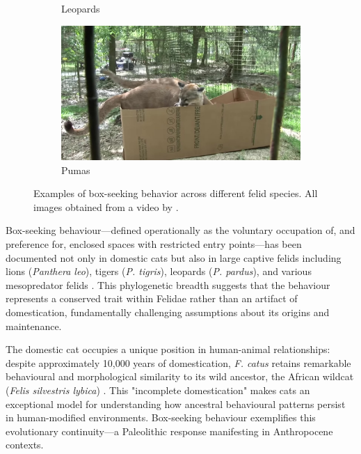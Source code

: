 \documentclass[12pt,a4paper]{article}
\begin{document}
\begin{figure}[h!]
\begin{subfigure}[b]{0.24\textwidth}
        \caption{Leopards}
        \label{fig:leopards}
    \end{subfigure}
    \hfill
    \begin{subfigure}[b]{0.24\textwidth}
        \includegraphics[width=\textwidth]{08_ares_orion_pumas.jpg}
        \caption{Pumas}
        \label{fig:pumas}
    \end{subfigure}
    \caption{Examples of box-seeking behavior across different felid species. All images obtained from a video by \citet{bigcatrescue2019}.}
    \label{fig:felids_in_boxes}
\end{figure}

Box-seeking behaviour—defined operationally as the voluntary occupation of, and preference for, enclosed spaces with restricted entry points—has been documented not only in domestic cats but also in large captive felids including lions (\textit{Panthera leo}), tigers (\textit{P. tigris}), leopards (\textit{P. pardus}), and various mesopredator felids \citep{shepherdson1998, mellen1992}. This phylogenetic breadth suggests that the behaviour represents a conserved trait within Felidae rather than an artifact of domestication, fundamentally challenging assumptions about its origins and maintenance.

The domestic cat occupies a unique position in human-animal relationships: despite approximately 10,000 years of domestication, \textit{F. catus} retains remarkable behavioural and morphological similarity to its wild ancestor, the African wildcat (\textit{Felis silvestris lybica}) \citep{driscoll2007}. This "incomplete domestication" \citep{bradshaw2016} makes cats an exceptional model for understanding how ancestral behavioural patterns persist in human-modified environments. Box-seeking behaviour exemplifies this evolutionary continuity—a Paleolithic response manifesting in Anthropocene contexts.
\end{document}
